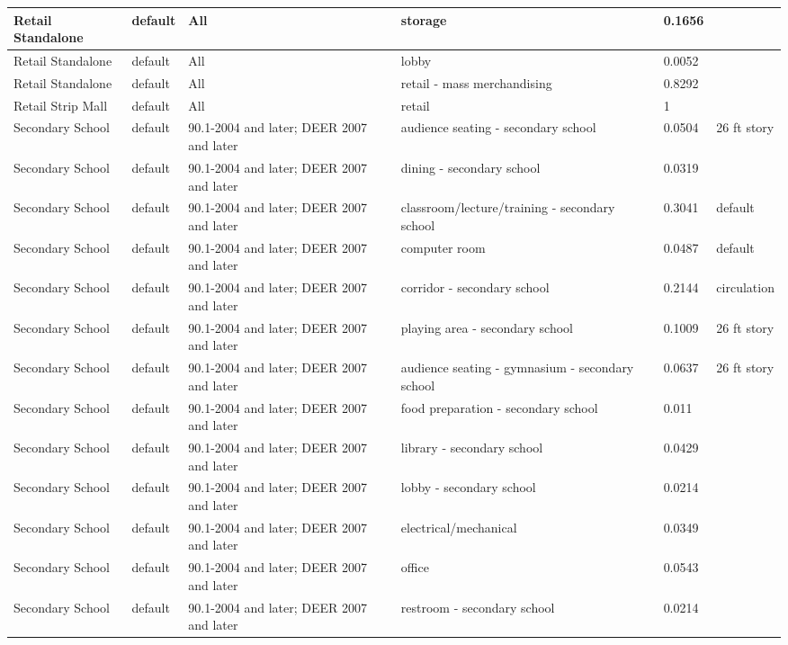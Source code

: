 \begin{center}
\begin{longtable}{|p{1.0in}|p{1.05in}|p{1.1in}|p{1.9in}|p{0.55in}|p{0.95in}|}
Retail Standalone & default & All & storage & 0.1656 &  \\ \hline
Retail Standalone & default & All & lobby & 0.0052 &  \\ \hline
Retail Standalone & default & All & retail - mass merchandising & 0.8292 &  \\ \hline
Retail Strip Mall & default & All & retail & 1 &  \\ \hline
Secondary School & default & 90.1-2004 and later; DEER 2007 and later & audience seating - secondary school & 0.0504 & 26 ft story \\ \hline
Secondary School & default & 90.1-2004 and later; DEER 2007 and later & dining - secondary school & 0.0319 &  \\ \hline
Secondary School & default & 90.1-2004 and later; DEER 2007 and later & classroom/lecture/training - secondary school & 0.3041 & default \\ \hline
Secondary School & default & 90.1-2004 and later; DEER 2007 and later & computer room & 0.0487 & default \\ \hline
Secondary School & default & 90.1-2004 and later; DEER 2007 and later & corridor - secondary school & 0.2144 & circulation \\ \hline
Secondary School & default & 90.1-2004 and later; DEER 2007 and later & playing area - secondary school & 0.1009 & 26 ft story \\ \hline
Secondary School & default & 90.1-2004 and later; DEER 2007 and later & audience seating - gymnasium - secondary school & 0.0637 & 26 ft story \\ \hline
Secondary School & default & 90.1-2004 and later; DEER 2007 and later & food preparation - secondary school & 0.011 &  \\ \hline
Secondary School & default & 90.1-2004 and later; DEER 2007 and later & library - secondary school & 0.0429 &  \\ \hline
Secondary School & default & 90.1-2004 and later; DEER 2007 and later & lobby - secondary school & 0.0214 &  \\ \hline
Secondary School & default & 90.1-2004 and later; DEER 2007 and later & electrical/mechanical & 0.0349 &  \\ \hline
Secondary School & default & 90.1-2004 and later; DEER 2007 and later & office & 0.0543 &  \\ \hline
Secondary School & default & 90.1-2004 and later; DEER 2007 and later & restroom - secondary school & 0.0214 &  \\ \hline

\end{longtable}
\end{center}
